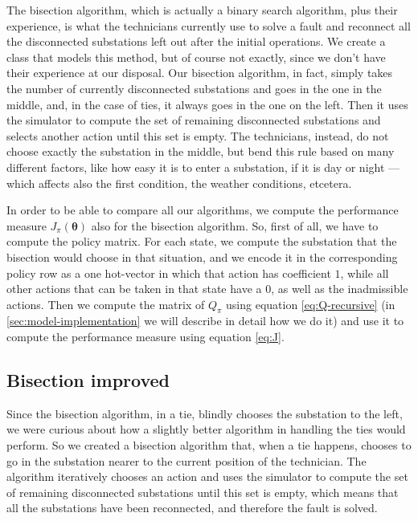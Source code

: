 The bisection algorithm, which is actually a binary search algorithm, plus their experience, is what the technicians currently use to solve a fault and reconnect all the disconnected substations left out after the initial operations. We create a class that models this method, but of course not exactly, since we don't have their experience at our disposal. Our bisection algorithm, in fact, simply takes the number of currently disconnected substations and goes in the one in the middle, and, in the case of ties, it always goes in the one on the left. Then it uses the simulator to compute the set of remaining disconnected substations and selects another action until this set is empty. The technicians, instead, do not choose exactly the substation in the middle, but bend this rule based on many different factors, like how easy it is to enter a substation, if it is day or night --- which affects also the first condition, the weather conditions, etcetera.

In order to be able to compare all our algorithms, we compute the performance measure $J_\pi(\boldsymbol \theta)$ also for the bisection algorithm. So, first of all, we have to compute the policy matrix. For each state, we compute the substation that the bisection would choose in that situation, and we encode it in the corresponding policy row as a one hot-vector in which that action has coefficient $1$, while all other actions that can be taken in that state have a $0$, as well as the inadmissible actions. Then we compute the matrix of $Q_\pi$ using equation \eqref{eq:Q-recursive} (in \autoref{sec:model-implementation} we will describe in detail how we do it) and use it to compute the performance measure using equation \eqref{eq:J}.


\subsection{Bisection improved}

Since the bisection algorithm, in a tie, blindly chooses the substation to the left, we were curious about how a slightly better algorithm in handling the ties would perform. So we created a bisection algorithm that, when a tie happens, chooses to go in the substation nearer to the current position of the technician. The algorithm iteratively chooses an action and uses the simulator to compute the set of remaining disconnected substations until this set is empty, which means that all the substations have been reconnected, and therefore the fault is solved.

